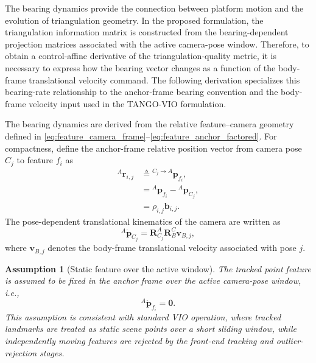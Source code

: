 \documentclass[journal]{IEEEtran}
\newtheorem{assumption}{Assumption}[section]
\begin{document}
The bearing dynamics provide the connection between platform motion and the
evolution of triangulation geometry. In the proposed formulation, the
triangulation information matrix is constructed from the bearing-dependent
projection matrices associated with the active camera-pose window. Therefore,
to obtain a control-affine derivative of the triangulation-quality metric, it is
necessary to express how the bearing vector changes as a function of the
body-frame translational velocity command. The following derivation specializes
this bearing-rate relationship to the anchor-frame bearing convention and the
body-frame velocity input used in the TANGO-VIO formulation.

The bearing dynamics are derived from the relative feature--camera geometry
defined in \eqref{eq:feature_camera_frame}--\eqref{eq:feature_anchor_factored}.
For compactness, define the anchor-frame relative position vector from camera
pose $C_j$ to feature $f_i$ as
\begin{equation}
    \begin{split}
  {}^{A}\bm{r}_{i,j}
  &\triangleq
  {}^{C_j\to A}\bm{p}_{f_i}, \\
  &=
  {}^{A}\bm{p}_{f_i}-{}^{A}\bm{p}_{C_j}, \\
  &= \rho_{i,j}\bm{b}_{i,j}.
  \label{eq:relative_position_anchor}
\end{split}
\end{equation}
The pose-dependent translational kinematics of the camera are written as
\begin{equation}
  {}^{A}\dot{\bm{p}}_{C_j}
  =
  \bm{R}_{C_j}^{A}\bm{R}_{B}^{C}\bm{v}_{B,j},
  \label{eq:pose_velocity}
\end{equation}
where $\bm{v}_{B,j}$ denotes the body-frame translational velocity associated
with pose $j$.

\begin{assumption}[Static feature over the active window]
\label{assumption:static_feature}
The tracked point feature is assumed to be fixed in the anchor frame over the
active camera-pose window, i.e.,
\begin{equation}
  {}^{A}\dot{\bm{p}}_{f_i}=\bm{0}.
\end{equation}
This assumption is consistent with standard VIO operation, where tracked
landmarks are treated as static scene points over a short sliding window, while
independently moving features are rejected by the front-end tracking and
outlier-rejection stages.
\end{assumption}
\end{document}
